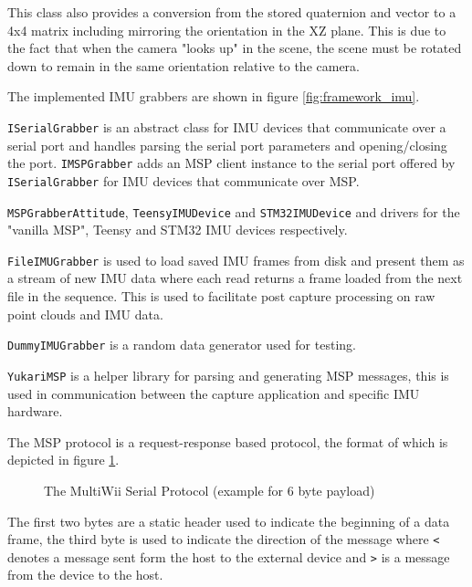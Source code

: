 \documentclass{entcs}
\newcommand{\bitrect}[2]{
  \begin{pgfonlayer}{foreground}
    \draw [thick] (0,0) rectangle (#1,1);
    \pgfmathsetmacro\result{#1-1}
    \foreach \x in {1,...,\result}
      \draw [thick] (\x,1) -- (\x, 0.8);
    \end{pgfonlayer}
  \bitlabels{#1}{#2}
}
\newcommand{\rwbits}[3]{
  \draw [thick] (#1,0) rectangle ++(#2,1) node[pos=0.5]{#3};
  \pgfmathsetmacro\start{#1+0.5}
  \pgfmathsetmacro\finish{#1+#2-0.5}
}
\newcommand{\bitlabels}[2] {
  \foreach \bit in {1,...,#1} {
    \pgfmathsetmacro\result{#2}
    \node [above] at (\bit-0.5, 1) {\pgfmathprintnumber{\result}};
  }
}
\begin{document}
This class also provides a conversion from the stored quaternion and vector to a
4x4 matrix including mirroring the orientation in the XZ plane. This is due to
the fact that when the camera "looks up" in the scene, the scene must be rotated
down to remain in the same orientation relative to the camera.

The implemented IMU grabbers are shown in figure \ref{fig:framework_imu}.

\texttt{ISerialGrabber} is an abstract class for IMU devices that communicate
over a serial port and handles parsing the serial port parameters and
opening/closing the port. \texttt{IMSPGrabber} adds an MSP client instance to
the serial port offered by \texttt{ISerialGrabber} for IMU devices that
communicate over MSP.

\texttt{MSPGrabberAttitude}, \texttt{TeensyIMUDevice} and
\texttt{STM32IMUDevice} and drivers for the "vanilla MSP", Teensy and STM32 IMU
devices respectively.

\texttt{FileIMUGrabber} is used to load saved IMU frames from disk and present
them as a stream of new IMU data where each read returns a frame loaded from the
next file in the sequence. This is used to facilitate post capture processing on
raw point clouds and IMU data.

\texttt{DummyIMUGrabber} is a random data generator used for testing.

\texttt{YukariMSP} is a helper library for parsing and generating MSP messages,
this is used in communication between the capture application and specific IMU
hardware.

The MSP protocol is a request-response based protocol, the format of which is
depicted in figure \ref{fig:msp_protocol}.

\begin{figure}[h!]
  \centering
  \caption{The MultiWii Serial Protocol (example for 6 byte payload)}
  \label{fig:msp_protocol}
\end{figure}

The first two bytes are a static header used to indicate the beginning of a data
frame, the third byte is used to indicate the direction of the message where
\texttt{<} denotes a message sent form the host to the external device and
\texttt{>} is a message from the device to the host.
\end{document}

